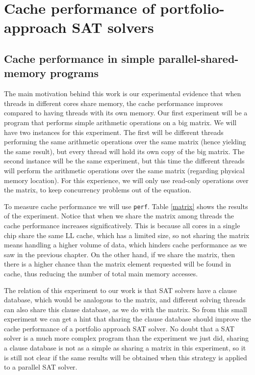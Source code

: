 \documentclass[12pt]{diicc}
\begin{document}
%  
\chapter{Cache performance of portfolio-approach SAT solvers}\label{chap:contributions}

\section{Cache performance in simple parallel-shared-memory programs}

The main motivation behind this work is our experimental evidence that when threads in different cores share memory, the cache performance improves compared to having threads with its own memory. Our first experiment will be a program that performs simple arithmetic operations on a big matrix. We will have two instances for this experiment. The first will be different threads performing the same arithmetic operations over the same matrix (hence yielding the same result), but every thread will hold its own copy of the big matrix. The second instance will be the same experiment, but this time the different threads will perform the arithmetic operations over the same matrix (regarding physical memory location). For this experience, we will only use read-only operations over the matrix, to keep concurrency problems out of the equation.

To measure cache performance we will use \texttt{perf}. Table \ref{matrix} shows the results of the experiment. Notice that when we share the matrix among threads the cache performance increases significatively. This is because all cores in a single chip share the same LL cache, which has a limited size, so not sharing the matrix means handling a higher volume of data, which hinders cache performance as we saw in the previous chapter. On the other hand, if we share the matrix, then there is a higher chance than the matrix element requested will be found in cache, thus reducing the number of total main memory accesses.

The relation of this experiment to our work is that SAT solvers have a clause database, which would be analogous to the matrix, and different solving threads can also share this clause database, as we do with the matrix. So from this small experiment we can get a hint that sharing the clause database should improve the cache performance of a portfolio approach SAT solver. No doubt that a SAT solver is a much more complex program than the experiment we just did, sharing a clause database is not as a simple as sharing a matrix in this experiment, so it is still not clear if the same results will be obtained when this strategy is applied to a parallel SAT solver.
\end{document}
